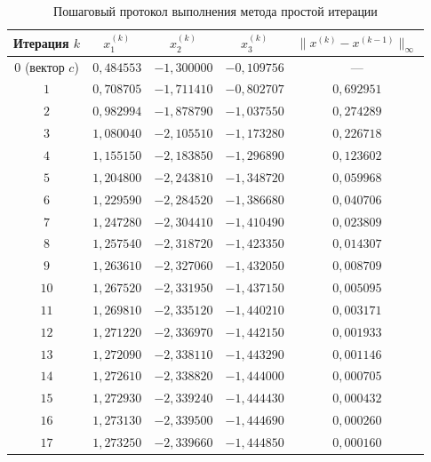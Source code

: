 \clearpage
\begin{table}[H]
    \caption{Пошаговый протокол выполнения метода простой итерации}
    \label{tab:iterations}
    \centering
    \scriptsize
    \renewcommand{\arraystretch}{0.85}
    \begin{tabular}{|c|c|c|c|c|}
        \hline
        \textbf{Итерация $k$} & $x_1^{(k)}$ & $x_2^{(k)}$ & $x_3^{(k)}$ & $\|x^{(k)} - x^{(k-1)}\|_\infty$ \\
        \hline
        $0$ (вектор $c$) & $0{,}484553$ & $-1{,}300000$ & $-0{,}109756$ & --- \\
        $1$ & $0{,}708705$ & $-1{,}711410$ & $-0{,}802707$ & $0{,}692951$ \\
        $2$ & $0{,}982994$ & $-1{,}878790$ & $-1{,}037550$ & $0{,}274289$ \\
        $3$ & $1{,}080040$ & $-2{,}105510$ & $-1{,}173280$ & $0{,}226718$ \\
        $4$ & $1{,}155150$ & $-2{,}183850$ & $-1{,}296890$ & $0{,}123602$ \\
        $5$ & $1{,}204800$ & $-2{,}243810$ & $-1{,}348720$ & $0{,}059968$ \\
        $6$ & $1{,}229590$ & $-2{,}284520$ & $-1{,}386680$ & $0{,}040706$ \\
        $7$ & $1{,}247280$ & $-2{,}304410$ & $-1{,}410490$ & $0{,}023809$ \\
        $8$ & $1{,}257540$ & $-2{,}318720$ & $-1{,}423350$ & $0{,}014307$ \\
        $9$ & $1{,}263610$ & $-2{,}327060$ & $-1{,}432050$ & $0{,}008709$ \\
        $10$ & $1{,}267520$ & $-2{,}331950$ & $-1{,}437150$ & $0{,}005095$ \\
        $11$ & $1{,}269810$ & $-2{,}335120$ & $-1{,}440210$ & $0{,}003171$ \\
        $12$ & $1{,}271220$ & $-2{,}336970$ & $-1{,}442150$ & $0{,}001933$ \\
        $13$ & $1{,}272090$ & $-2{,}338110$ & $-1{,}443290$ & $0{,}001146$ \\
        $14$ & $1{,}272610$ & $-2{,}338820$ & $-1{,}444000$ & $0{,}000705$ \\
        $15$ & $1{,}272930$ & $-2{,}339240$ & $-1{,}444430$ & $0{,}000432$ \\
        $16$ & $1{,}273130$ & $-2{,}339500$ & $-1{,}444690$ & $0{,}000260$ \\
        $17$ & $1{,}273250$ & $-2{,}339660$ & $-1{,}444850$ & $0{,}000160$ \\

\end{tabular}
\end{table}
